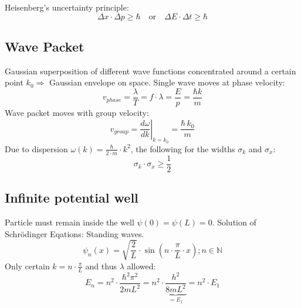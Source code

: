 Heisenberg's uncertainty principle:
\begin{equation*}
    \Delta x \cdot \Delta p \geq \hbar\quad \text{or}\quad \Delta E \cdot \Delta t \geq \hbar
\end{equation*}

\subsection{Wave Packet}
Gaussian superposition of different wave functions concentrated around a certain point \(k_0 \Rightarrow\) Gaussian envelope on space.
Single wave moves at phase velocity:
\begin{equation*}
    v_{phase} = \frac{\lambda}{T} = f \cdot \lambda = \frac{E}{p} = \frac{\hbar k}{m}
\end{equation*}
Wave packet moves with group velocity:
\begin{equation*}
    v_{group} = \left.\frac{d\omega}{dk}\right|_{k = k_0} = \frac{\hbar\, k_0}{m}
\end{equation*}
Due to dispersion \(\omega(k) = \frac{\hbar}{2\cdot m}\cdot k^2\), the following for the widths \(\sigma_k\) and \(\sigma_x\):
\begin{equation*}
    \sigma_k \cdot \sigma_x \ge \frac{1}{2}
\end{equation*}

\subsection{Infinite potential well}
Particle must remain inside the well \(\psi(0) = \psi(L) = 0\). Solution of Schrödinger Eqations: Standing waves.
\begin{equation*}
    \psi_n (x)  = \sqrt{\frac{2}{L}}\cdot\sin(n\cdot\frac{\pi}{L}\cdot x); n \in \mathbb{N}
\end{equation*}
Only certain \(k = n\cdot\frac{\pi}{L}\) and thus \(\lambda\) allowed:
\begin{equation*}
    E_n = n^2 \cdot \frac{\hbar^2 \pi^2}{2 m L^2} 
        = n^2 \cdot \underbrace{\frac{h^2}{8 m L^2}}_{= E_1} 
        = n^2 \cdot E_1
\end{equation*}


